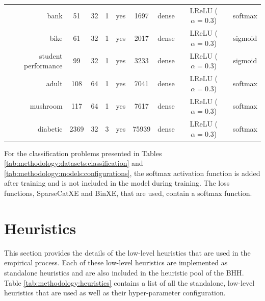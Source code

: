 \begin{table}[htb]
{\begin{tabular}{rcccccccc}
                  bank                & 51              & 32              & 1               & yes             & 1697                & dense             & LReLU ($\alpha = 0.3$) & softmax                \\
                  bike                & 61              & 32              & 1               & yes             & 2017                & dense             & LReLU ($\alpha = 0.3$) & sigmoid                \\
                  student performance & 99              & 32              & 1               & yes             & 3233                & dense             & LReLU ($\alpha = 0.3$) & sigmoid                \\
                  adult               & 108             & 64              & 1               & yes             & 7041                & dense             & LReLU ($\alpha = 0.3$) & softmax                \\
                  mushroom            & 117             & 64              & 1               & yes             & 7617                & dense             & LReLU ($\alpha = 0.3$) & softmax                \\
                  diabetic            & 2369            & 32              & 3               & yes             & 75939               & dense             & LReLU ($\alpha = 0.3$) & softmax                \\
            \end{tabular}%
      }
\end{table}%

For the classification problems presented in Tables \ref{tab:methodology:datasets:classification} and \ref{tab:methodology:models:configurations}, the softmax activation function is added after training and is not included in the model during training. The loss functions, \acf{SparseCatXE} and \acf{BinXE}, that are used, contain a softmax function.

\section{Heuristics}\label{sec:methodology:heuristics}

This section provides the details of the low-level heuristics that are used in the empirical process. Each of these low-level heuristics are implemented as standalone heuristics and are also included in the heuristic pool of the \acs{BHH}. Table \ref{tab:methodology:heuristics} contains a list of all the standalone, low-level heuristics that are used as well as their hyper-parameter configuration.

